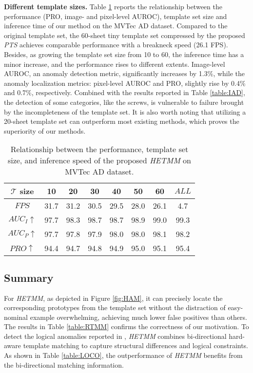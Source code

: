 \documentclass[default,iicol]{sn-jnl}\usepackage[algo2e,ruled,linesnumbered]{algorithm2e}
\theoremstyle{thmstyleone}\newtheorem{theorem}{Theorem}\newtheorem{proposition}[theorem]{Proposition}
\theoremstyle{thmstyletwo}\newtheorem{example}{Example}\newtheorem{remark}{Remark}
\theoremstyle{thmstylethree}\newtheorem{definition}{Definition}
\begin{document}
\noindent\textbf{Different template sizes. }
Table \ref{table:Templates} reports the relationship between the performance (PRO, image- and pixel-level AUROC), template set size and inference time of our method on the MVTec AD dataset.
Compared to the original template set, the 60-sheet tiny template set compressed by the proposed \textit{PTS} achieves comparable performance with a breakneck speed (26.1 FPS).
Besides, as growing the template set size from 10 to 60, the inference time has a minor increase, and the performance rises to different extents.
Image-level AUROC, an anomaly detection metric, significantly increases by 1.3\%, while the anomaly localization metrics: pixel-level AUROC and PRO, slightly rise by 0.4\% and 0.7\%, respectively.
Combined with the results reported in Table \ref{table:IAD}, the detection of some categories, like the screws, is vulnerable to failure brought by the incompleteness of the template set.
It is also worth noting that utilizing a 20-sheet template set can outperform most existing methods, which proves the superiority of our methods.

\begin{table}[!t]
    \setlength{\tabcolsep}{1.8mm}
    \caption{
        Relationship between the performance, template set size, and inference speed of the proposed \textit{HETMM} on MVTec AD dataset.
    }
    \centering
    \footnotesize
    \label{table:Templates}
    \begin{tabular}{c|ccccccc}
        \hline
       $\mathcal{T}$ size  &10   &20   &30   &40   &50   &60   &$ALL$ \\\hline
       $FPS$               &31.7 &31.2 &30.5 &29.5 &28.0 &26.1 &4.7   \\
       $AUC_{I}\uparrow$   &97.7 &98.3 &98.7 &98.7 &98.9 &99.0 &99.3  \\
       $AUC_{P}\uparrow$   &97.7 &97.8 &97.9 &98.0 &98.0 &98.1 &98.2  \\
       $PRO\uparrow$       &94.4 &94.7 &94.8 &94.9 &95.0 &95.1 &95.4  \\\hline
\end{tabular}
\end{table}

\subsection{Summary}
For \textit{HETMM}, as depicted in Figure \ref{fig:HAM}, it can precisely locate the corresponding prototypes from the template set without the distraction of easy-nominal example overwhelming, achieving much lower false positives than others.
The results in Table \ref{table:RTMM} confirms the correctness of our motivation.
To detect the logical anomalies reported in \cite{MVTECLOCO}, \textit{HETMM} combines bi-directional hard-aware template matching to capture structural differences and logical constraints.
As shown in Table \ref{table:LOCO}, the outperformance of \textit{HETMM} benefits from the bi-directional matching information.
\end{document}

